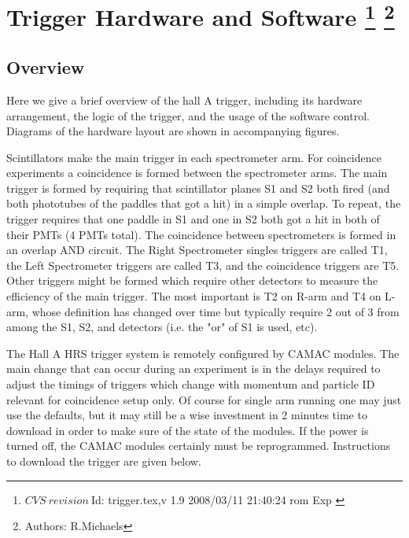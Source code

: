 \chapter[Trigger Hardware and Software]{Trigger Hardware and Software
\footnote{
  $CVS~revision~ $Id: trigger.tex,v 1.9 2008/03/11 21:40:24 rom Exp $ $
}
\footnote{Authors: R.Michaels }
}

\section{Overview}
\par
Here we give a brief overview of the 
hall A trigger, including its hardware arrangement,
the logic of the trigger, and the usage
of the software control.
Diagrams of the hardware layout are shown in
accompanying figures.

\par

Scintillators make the main trigger 
in each spectrometer arm. For coincidence experiments a 
coincidence is formed between the spectrometer arms.   
The main trigger is formed by requiring that scintillator 
planes S1 and S2 both fired (and both phototubes of the 
paddles that got a hit) in a simple overlap. To repeat, 
the trigger requires that one paddle in S1 and one in 
S2 both got a hit in both of their PMTs (4 PMTs total).  
The coincidence between spectrometers is formed in an 
overlap AND circuit.  The Right Spectrometer singles 
triggers are called T1, the Left Spectrometer triggers 
are called T3, and the coincidence triggers are T5.   
Other triggers might be formed which require other detectors 
to measure the efficiency of the main trigger. The most 
important is T2 on R-arm and T4 on L-arm, whose definition 
has changed over time but typically require 2 out of 3 
from among the S1, S2, and \Cherenkov{} detectors (i.e. the 
"or" of S1 is used, etc).

The Hall A HRS trigger system is remotely configured by 
CAMAC modules.   The main change that can occur during 
an experiment is in the delays required to adjust the 
timings of triggers which change with momentum and 
particle ID relevant for coincidence setup only.   
Of course for single arm running one may just use the 
defaults, but it may still be a wise investment in 2 
minutes time to download in order to make sure of 
the state of the modules.   If the power is turned off, 
the CAMAC modules certainly must be reprogrammed. 
Instructions to download the trigger are given below.

